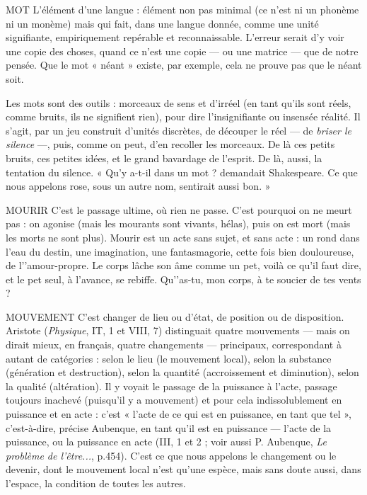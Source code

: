 MOT L'élément d’une langue : élément non pas minimal (ce n’est ni un
phonème ni un monème) mais qui fait, dans une langue donnée,
comme une unité signifiante, empiriquement repérable et reconnaissable.
L'erreur serait d’y voir une copie des choses, quand ce n’est une copie — ou une
matrice — que de notre pensée. Que le mot « néant » existe, par exemple, cela
ne prouve pas que le néant soit.

Les mots sont des outils : morceaux de sens et d’irréel (en tant qu’ils sont
réels, comme bruits, ils ne signifient rien), pour dire l’insignifiante ou insensée
réalité. Il s’agit, par un jeu construit d’unités discrètes, de découper le réel — de
{\it briser le silence} —, puis, comme on peut, d’en recoller les morceaux. De là ces
petits bruits, ces petites idées, et le grand bavardage de l'esprit. De là, aussi,
la tentation du silence. « Qu’y a-t-il dans un mot ? demandait Shakespeare. Ce
que nous appelons rose, sous un autre nom, sentirait aussi bon. »

MOURIR C'est le passage ultime, où rien ne passe. C’est pourquoi on ne
meurt pas : on agonise (mais les mourants sont vivants, hélas),
puis on est mort (mais les morts ne sont plus). Mourir est un acte sans sujet, et
sans acte : un rond dans l’eau du destin, une imagination, une fantasmagorie,
cette fois bien douloureuse, de l’'amour-propre. Le corps lâche son âme comme
un pet, voilà ce qu'il faut dire, et le pet seul, à l’avance, se rebiffe. Qu'’as-tu,
mon corps, à te soucier de tes vents ?

MOUVEMENT C'est changer de lieu ou d’état, de position ou de disposition.
Aristote ({\it Physique}, IT, 1 et VIII, 7) distinguait quatre mouvements — mais
on dirait mieux, en français, quatre changements — principaux, correspondant
à autant de catégories : selon le lieu (le mouvement local), selon la substance
(génération et destruction), selon la quantité (accroissement et diminution),
selon la qualité (altération). Il y voyait le passage de la puissance à l’acte, passage
toujours inachevé (puisqu'il y a mouvement) et pour cela indissolublement
en puissance et en acte : c’est « l’acte de ce qui est en puissance, en tant
que tel », c’est-à-dire, précise Aubenque, en tant qu’il est en puissance — l’acte
de la puissance, ou la puissance en acte (III, 1 et 2 ; voir aussi P. Aubenque, {\it Le
problème de l'être...}, p.454). C’est ce que nous appelons le changement ou le
devenir, dont le mouvement local n’est qu’une espèce, mais sans doute aussi,
dans l’espace, la condition de toutes les autres.

